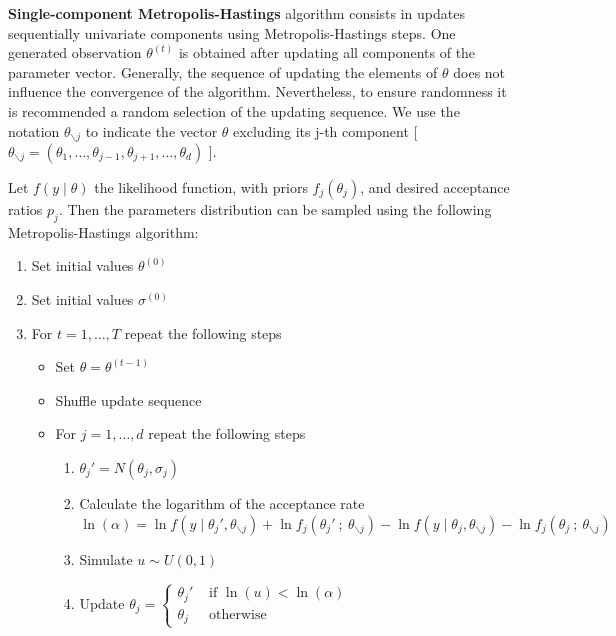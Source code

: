 \documentclass[11pt,fleqn]{book} %
\begin{document}
\textbf{Single-component Metropolis-Hastings} algorithm consists in updates 
sequentially univariate components using Metropolis-Hastings steps. 
One generated observation $\theta^{(t)}$ is obtained after updating all 
components of the parameter vector. Generally, the sequence of updating the 
elements of $\theta$ does not influence the convergence of the algorithm.
Nevertheless, to ensure randomness it is recommended a random selection of 
the updating sequence. We use the notation $\theta_{\backslash j}$ to indicate 
the vector $\theta$ excluding its j-th component [ $\theta_{\backslash j}
= (\theta_1,\dots,\theta_{j-1},\theta_{j+1},\dots,\theta_{d})$ ].

\begin{algorithm} 
	\label{alg:bimh}
	Let $f(y \mid \theta)$ the likelihood function, with priors $f_j(\theta_j)$,
	and desired acceptance ratios $p_j$. Then the parameters distribution
	can be sampled using the following Metropolis-Hastings algorithm:
	\begin{enumerate}
		\item Set initial values $\theta^{(0)}$
		\item Set initial values $\sigma^{(0)}$
		\item For $t=1,\dots,T$ repeat the following steps
		\begin{itemize}
			\item Set $\theta=\theta^{(t-1)}$
			\item Shuffle update sequence
			\item For $j=1,\dots,d$ repeat the following steps
			\begin{enumerate}[label=\alph*.]
				\item $\theta_j' = N(\theta_j,\sigma_j)$
				\item Calculate the logarithm of the acceptance rate \\
				$\ln(\alpha) = 
					\ln f(y \mid \theta_j',\theta_{\backslash j}) + 
					\ln f_j(\theta_j'\ ;\ \theta_{\backslash j}) - 
					\ln f(y \mid \theta_j,\theta_{\backslash j}) - 
					\ln f_j(\theta_j\ ; \ \theta_{\backslash j})
				$
				\item Simulate $u \sim U(0,1)$
				\item Update $\theta_j=\left\{
				\begin{array}{ll}
					\theta_j' & \text{ if } \ln(u) < \ln(\alpha) \\
					\theta_j  & \text{ otherwise }               
				\end{array}\right.$ 

\end{enumerate}
\end{itemize}
\end{enumerate}
\end{algorithm}
\end{document}
